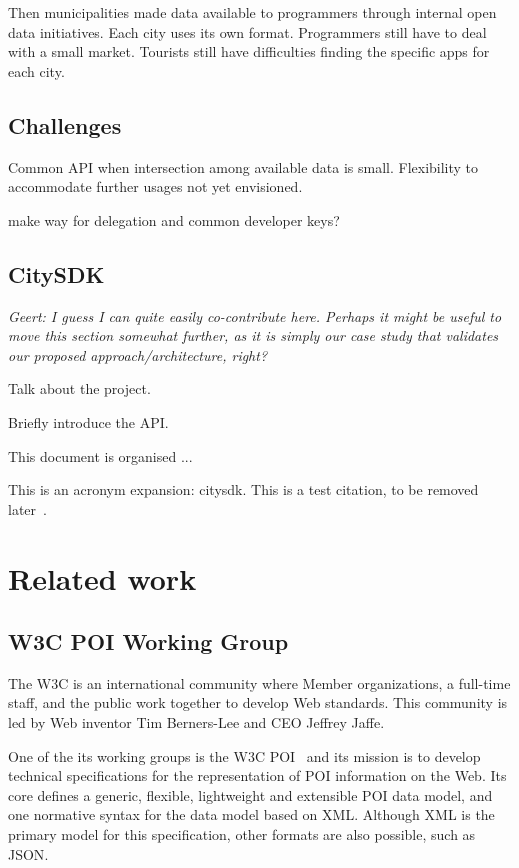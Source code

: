 \documentclass[times]{ettauth}
\begin{document}
Then municipalities made data available to programmers through internal open data initiatives.
Each city uses its own format.
Programmers still have to deal with a small market.
Tourists still have difficulties finding the specific apps for each city.

\subsection{Challenges}
Common API when intersection among available data is small.
Flexibility to accommodate further usages not yet envisioned.

make way for delegation and common developer keys?


\subsection{CitySDK}

\emph{Geert: I guess I can quite easily co-contribute here. Perhaps it might be useful to move this section somewhat further, as it is simply our case study that validates our proposed approach/architecture, right?}

Talk about the project.

Briefly introduce the API.

This document is organised ...

This is an acronym expansion: \ac{citysdk}.
This is a test citation, to be removed later~\cite{1509968}.



\section{Related work}

\subsection{\acf{W3C} POI Working Group}
\label{section:poi-wg}
The \ac{W3C} is an international community where Member organizations, a full-time staff, and the public work together to develop Web standards. This community is led by Web inventor Tim Berners-Lee and CEO Jeffrey Jaffe. 

One of the its working groups is the \ac{W3C} POI~\cite{w3c-poi} and its mission is to develop technical specifications for the representation of \acf{POI} information on the Web. Its core defines a generic, flexible, lightweight and extensible POI data model, and one normative syntax for the data model based on \acf{XML}. Although \ac{XML} is the primary model for this specification, other formats are also possible, such as \acf{JSON}.
\end{document}
